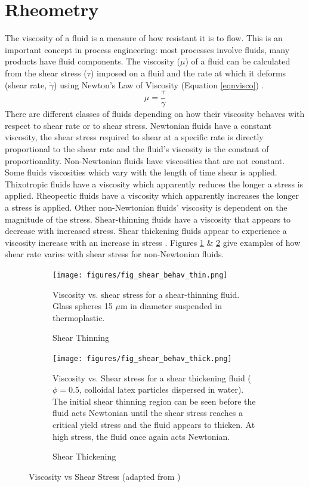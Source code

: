 \documentclass[twoside,a4]{report}
\def\br{\newline \newline \noindent}
\begin{document}
	\section*{Rheometry}
	The viscosity of a fluid is a measure of how resistant it is to flow. This is an important concept in process engineering: most processes involve fluids, many products have fluid components. The viscosity (\(\mu\)) of a fluid can be calculated from the shear stress (\(\tau\)) imposed on a fluid and the rate at which it deforms (shear rate, \(\dot{\gamma}\)) using Newton's Law of Viscosity (Equation \ref{eqnvisco}) \cite{backfluidmech}.
	\begin{equation}
	\mu = \frac{\tau}{\dot{\gamma}}
	\label{eqnvisco}
	\end{equation}
	There are different classes of fluids depending on how their viscosity behaves with respect to shear rate or to shear stress. Newtonian fluids have a constant viscosity, the shear stress required to shear at a specific rate is directly proportional to the shear rate and the fluid's viscosity is the constant of proportionality. Non-Newtonian fluids have viscosities that are not constant. Some fluids viscosities which vary with the length of time shear is applied. Thixotropic fluids have a viscosity which apparently reduces the longer a stress is applied. Rheopectic fluids have a viscosity which apparently increases the longer a stress is applied. Other non-Newtonian fluids' viscosity is dependent on the magnitude of the stress. Shear-thinning fluids have a viscosity that appears to decrease with increased stress. Shear thickening fluids appear to experience a viscosity increase with an increase in stress \cite{backtypesofnonnewt}. Figures \ref{figshearthin} \& \ref{figshearthick} give examples of how shear rate varies with shear stress for non-Newtonian fluids. 
	\br
	\begin{figure}[!htb]
		\centering
		\begin{subfigure}[t]{0.45\textwidth}
			\centering
			\texttt{[image: figures/fig\_shear\_behav\_thin.png]}
			\caption{Shear Thinning}
			\label{figshearthin}
			\footnotesize 
			Viscosity vs. shear stress for a shear-thinning fluid. Glass spheres 15 $\mu$m in diameter suspended in thermoplastic.
		\end{subfigure}
		\begin{subfigure}[t]{0.45\textwidth}
			\centering
			\texttt{[image: figures/fig\_shear\_behav\_thick.png]}
			\caption{Shear Thickening}
			\label{figshearthick}
			\footnotesize 
			Viscosity vs. Shear stress for a shear thickening fluid ($\phi=0.5$, colloidal latex particles dispersed in water). The initial shear thinning region can be seen before the fluid acts Newtonian until the shear stress reaches a critical yield stress and the fluid appears to thicken. At high stress, the fluid once again acts Newtonian.
		\end{subfigure}
		\label{figshearthinthick}
		\caption{Viscosity vs Shear Stress (adapted from \cite{figshearthin, figshearthick})}
	\end{figure}
	
\end{document}
